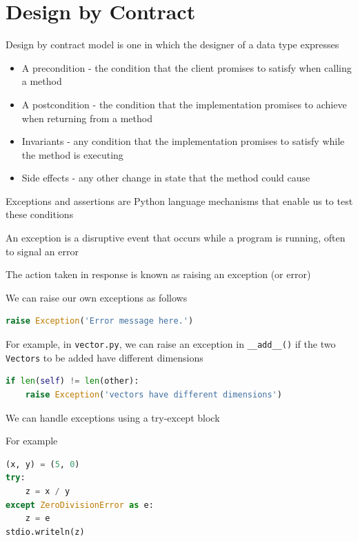 \documentclass[8pt,a4paper,compress]{beamer}
\begin{document}
\section{Design by Contract}
\begin{frame}[fragile]
\pause

Design by contract model is one in which the designer of a data type expresses
\begin{itemize}
\item A precondition - the condition that the client promises to satisfy when calling a method
\item A postcondition - the condition that the implementation promises to achieve when returning from a method
\item Invariants - any condition that the implementation promises to satisfy while the method is executing 
\item Side effects - any other change in state that the method could cause
\end{itemize}

\pause
\bigskip

Exceptions and assertions are Python language mechanisms that enable us to test these conditions
\end{frame}

\begin{frame}[fragile]
\pause

An exception is a disruptive event that occurs while a program is running, often to signal an error

\pause
\bigskip

The action taken in response is known as raising an exception (or error)

\pause
\bigskip

We can raise our own exceptions as follows
\begin{lstlisting}[language=Python]
raise Exception('Error message here.')
\end{lstlisting} 

\pause
\bigskip

For example, in \lstinline{vector.py}, we can raise an exception in \lstinline{__add__()} if the two \lstinline{Vectors} to be added have different dimensions
\begin{lstlisting}[language=Python]
if len(self) != len(other):
    raise Exception('vectors have different dimensions')
\end{lstlisting} 

\pause
\bigskip

We can handle exceptions using a try-except block

\pause
\bigskip

For example
\begin{lstlisting}[language=Python]
(x, y) = (5, 0)
try:
    z = x / y
except ZeroDivisionError as e:
    z = e
stdio.writeln(z)
\end{lstlisting} 
\end{frame}
\end{document}
